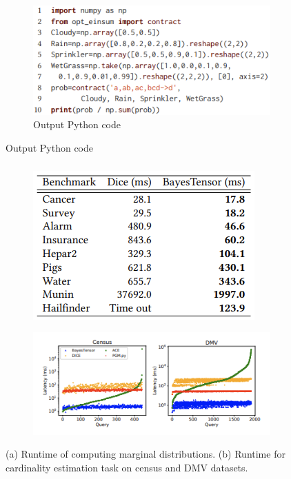 \documentclass{beamer}
\begin{document}
\begin{frame}
\begin{figure}
		\begin{subfigure}{0.5 \textwidth}
			\centering
			\includegraphics[scale=0.4]{imgs/code_example.png}
			\caption{Output Python code}
		\end{subfigure}
	\end{figure}
\end{frame}

\begin{frame}
	\frametitle{}
	\begin{figure}
		\begin{subfigure}{0.45\textwidth}
			\centering
			\includegraphics[scale=0.45]{imgs/table_infer.png}
			\caption{}
		\end{subfigure}%
		\begin{subfigure}{0.55\textwidth}
			\centering
			\includegraphics[scale=0.5]{imgs/runtime_comp.png}
			\caption{}
		\end{subfigure}
		\caption*{(a) Runtime of computing marginal distributions. (b) Runtime for cardinality estimation task on census and DMV datasets.}
	\end{figure}
\end{frame}
\end{document}
